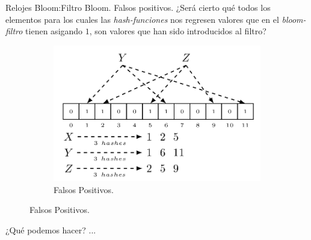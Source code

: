 \begin{frame}[fragile]{Relojes Bloom:}{Filtro Bloom. Falsos positivos.}
  \justifying
  ¿Será cierto qué todos los elementos para los cuales
  las \textit{hash-funciones} nos regresen valores que en
  el \textit{bloom-filtro}  tienen asigando $1$,
  son valores que han sido introducidos al filtro?
  \begin{figure}
    \centering
    \begin{subfigure}[b]{0.5\textwidth}
      \includegraphics[width=\textwidth]{./Imagenes/FalsosPositivos}
      \caption{Falsos Positivos.}
      \label{fig:Ejemplo de un Falso Positivo.}
    \end{subfigure}
  \end{figure}
  ¿Qué podemos hacer? ...
\end{frame}

